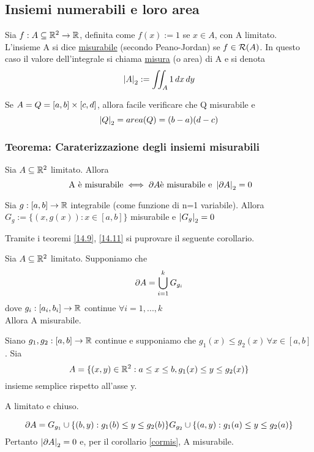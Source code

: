 \subsection{Insiemi numerabili e loro area}
\begin{definition}
  Sia $f: A \subseteq \mathbb{R}^2 \to \mathbb{R}$, definita come $f(x):=1$ se $x\in A$, con A limitato. L'insieme A si dice \underline{misurabile}
  (secondo Peano-Jordan) se $f \in \mathcal{R}(A)$. In questo caso il valore dell'integrale si chiama
  \underline{misura} (o area) di A e si denota $$\left\lvert A \right\rvert_2 := \iint_{A} 1 \,dx\,dy$$ 
\end{definition}
\begin{osservazione}
  Se $A = Q = [a,b]\times[c,d]$, allora \ace facile verificare che Q \ace misurabile e 
  $$\left\lvert Q \right\rvert_2 = area(Q) = (b-a)(d-c)$$
\end{osservazione}
\subsubsection{Teorema: Caraterizzazione degli insiemi misurabili}
\begin{theorem}
  \label{14.9}
  Sia $A \subseteq \mathbb{R}^2$ limitato. Allora 
  $$\text{ A \`e misurabile} \iff \partial A \text{\`e misurabile e } \left\lvert \partial A \right\rvert_2 = 0$$
\end{theorem}
\begin{theorem}[BDPG, 14.11]
  \label{14.11}
  Sia $g:[a,b]\to \mathbb{R}$ integrabile (come funzione di n=1 variabile). Allora 
  $G_{g} := \{(x,g(x)) : x \in [a,b]\}$ \ace misurabile e $\left\lvert G_{g} \right\rvert_2 = 0$
\end{theorem}
Tramite i teoremi \ref{14.9}, \ref{14.11} si pu\aco provare il seguente corollario.
\begin{corollary}
  \label{cormis}
  Sia $A \subseteq \mathbb{R}^2$ limitato. Supponiamo che 
  $$\partial A = \bigcup_{i = 1}^k G_{g_i}$$ dove $g_{i} : [a_i,b_i] \to \mathbb{R}$ continue $\forall i = 1, ..., k$\\
  Allora A \ace misurabile.
\end{corollary}
\begin{example}
  Siano $g_1,g_2 : [a,b]\to \mathbb{R}$ continue e supponiamo che $g_1(x) \leq g_2(x) \, \forall x\in [a,b]$. Sia
  $$A = \{(x,y)\in \mathbb{R}^2 : a \leq x \leq b, g_1(x) \leq y \leq g_2(x)\}$$
  insieme semplice rispetto all'asse y.
  \begin{exercise}
    A \ace limitato e chiuso.
  \end{exercise}
  $$\partial A = G_{g_1} \cup \{(b,y) : g_{1}(b) \leq y \leq g_2(b)\} G_{g_2} \cup \{(a,y) : g_{1}(a) \leq y \leq g_2(a)\}$$
  Pertanto $\left\lvert \partial A \right\rvert_2 = 0$ e, per il corollario \ref{cormis}, A \ace misurabile.
\end{example}
